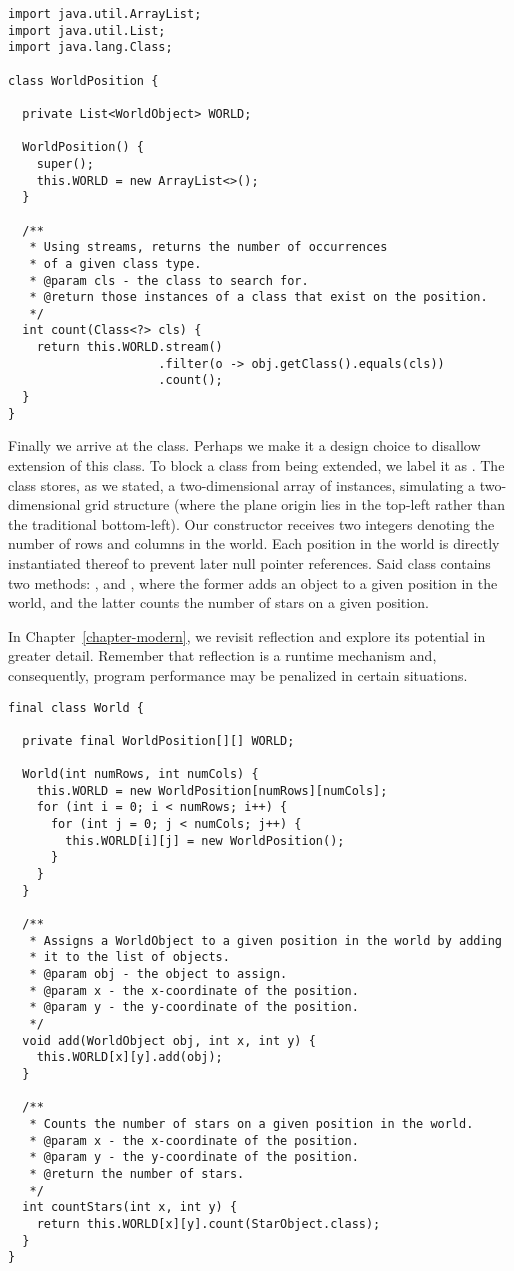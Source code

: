 \begin{lstlisting}[language=MyJava]
import java.util.ArrayList;
import java.util.List;
import java.lang.Class;

class WorldPosition {

  private List<WorldObject> WORLD;

  WorldPosition() { 
    super(); 
    this.WORLD = new ArrayList<>();  
  }

  /**
   * Using streams, returns the number of occurrences 
   * of a given class type.
   * @param cls - the class to search for.
   * @return those instances of a class that exist on the position.
   */
  int count(Class<?> cls) {
    return this.WORLD.stream()
                     .filter(o -> obj.getClass().equals(cls))
                     .count();
  }
}
\end{lstlisting}

Finally we arrive at the  class. Perhaps we make it a design choice to disallow extension of this class. To block a class from being extended, we label it as . The  class stores, as we stated, a two-dimensional array of  instances, simulating a two-dimensional grid structure (where the plane origin lies in the top-left rather than the traditional bottom-left). Our constructor receives two integers denoting the number of rows and columns in the world. Each position in the world is directly instantiated thereof to prevent later null pointer references. Said  class contains two methods: , and , where the former adds an object to a given position in the world, and the latter counts the number of stars on a given position.

In Chapter~\ref{chapter-modern}, we revisit reflection and explore its potential in greater detail. Remember that reflection is a runtime mechanism and, consequently, program performance may be penalized in certain situations.

\begin{lstlisting}[language=MyJava]
final class World {
  
  private final WorldPosition[][] WORLD;

  World(int numRows, int numCols) {
    this.WORLD = new WorldPosition[numRows][numCols];
    for (int i = 0; i < numRows; i++) {
      for (int j = 0; j < numCols; j++) {
        this.WORLD[i][j] = new WorldPosition();
      }
    }
  }

  /**
   * Assigns a WorldObject to a given position in the world by adding
   * it to the list of objects.
   * @param obj - the object to assign.
   * @param x - the x-coordinate of the position.
   * @param y - the y-coordinate of the position.
   */
  void add(WorldObject obj, int x, int y) {
    this.WORLD[x][y].add(obj);
  }

  /**
   * Counts the number of stars on a given position in the world.
   * @param x - the x-coordinate of the position.
   * @param y - the y-coordinate of the position.
   * @return the number of stars.
   */
  int countStars(int x, int y) {
    return this.WORLD[x][y].count(StarObject.class);
  }
}
\end{lstlisting}

